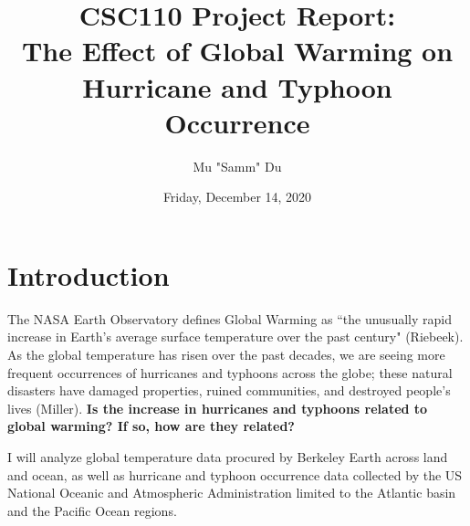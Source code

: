 \documentclass[fontsize=11pt]{article}
\title{CSC110 Project Report: \\The Effect of Global Warming on Hurricane and Typhoon Occurrence}
\author{Mu "Samm" Du}
\date{Friday, December 14, 2020}
\begin{document}
\maketitle

\section*{Introduction}

\qquad The NASA Earth Observatory defines Global Warming as ``the unusually rapid increase in Earth’s average surface temperature over the past century" (Riebeek). As the global temperature has risen over the past decades, we are seeing more frequent occurrences of hurricanes and typhoons across the globe; these natural disasters have damaged properties, ruined communities, and destroyed people's lives (Miller). \textbf{Is the increase in hurricanes and typhoons related to global warming? If so, how are they related?}

\enspace I will analyze global temperature data procured by Berkeley Earth across land and ocean, as well as hurricane and typhoon occurrence data collected by the US National Oceanic and Atmospheric Administration limited to the Atlantic basin and the Pacific Ocean regions.
\end{document}
